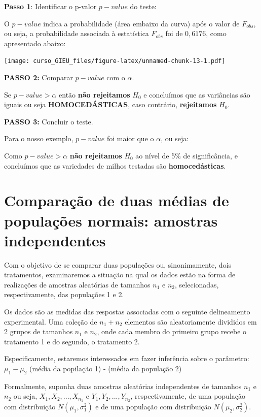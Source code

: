 \documentclass[
]{book}
\begin{document}
\textbf{Passo 1}: Identificar o p-valor \(p-value\) do teste:

O \(p-value\) indica a probabilidade (área embaixo da curva) após o valor de \(F_{obs}\), ou seja, a probabilidade associada à estatística \(F_{obs}\) foi de \(0,6176\), como apresentado abaixo:

\texttt{[image: curso\_GIEU\_files/figure-latex/unnamed-chunk-13-1.pdf]}

\textbf{PASSO 2:} Comparar \(p-value\) com o \(\alpha\).

Se \(p-value > \alpha\) então \textbf{não rejeitamos} \(H_0\) e concluímos que as variâncias são iguais ou seja \textbf{HOMOCEDÁSTICAS}, caso contrário, \textbf{rejeitamos} \(H_0\).

\textbf{PASSO 3:} Concluir o teste.

Para o nosso exemplo, \(p-value\) foi maior que o \(\alpha\), ou seja:

Como \(p-value > \alpha\) \textbf{não rejeitamos } \(H_0\) ao nível de 5\% de significância, e concluímos que as variedades de milhos testadas são \textbf{homocedásticas}.

\hypertarget{comparauxe7uxe3o-de-duas-muxe9dias-de-populauxe7uxf5es-normais-amostras-independentes}{%
\section{Comparação de duas médias de populações normais: amostras independentes}\label{comparauxe7uxe3o-de-duas-muxe9dias-de-populauxe7uxf5es-normais-amostras-independentes}}

Com o objetivo de se comparar duas populações ou, sinonimamente, dois tratamentos, examinaremos a situação na qual os dados estão na forma de realizações de amostras aleatórias de tamanhos \(n_1\) e \(n_2\), selecionadas, respectivamente, das populações 1 e 2.

Os dados são as medidas das respostas associadas com o seguinte delineamento experimental. Uma coleção de \(n_1 + n_2\) elementos são aleatoriamente divididos em 2 grupos de tamanhos \(n_1\) e \(n_2\), onde cada membro do primeiro grupo recebe o tratamento 1 e do segundo, o tratamento 2.

Especificamente, estaremos interessados em fazer inferência sobre o parâmetro: \(\mu_1 - \mu_2\) (média da popilação 1) - (média da população 2)

Formalmente, suponha duas amostras aleatórias independentes de tamanhos \(n_1\) e \(n_2\) ou seja, \(X_1,X_2,...,X_{n_1}\) e \(Y_1,Y_2,...,Y_{n_2}\), respectivamente, de uma população com distribuição \(N(\mu_1, \sigma_1^2)\) e de uma população com distribuição \(N(\mu_2, \sigma_2^2)\).
\end{document}
